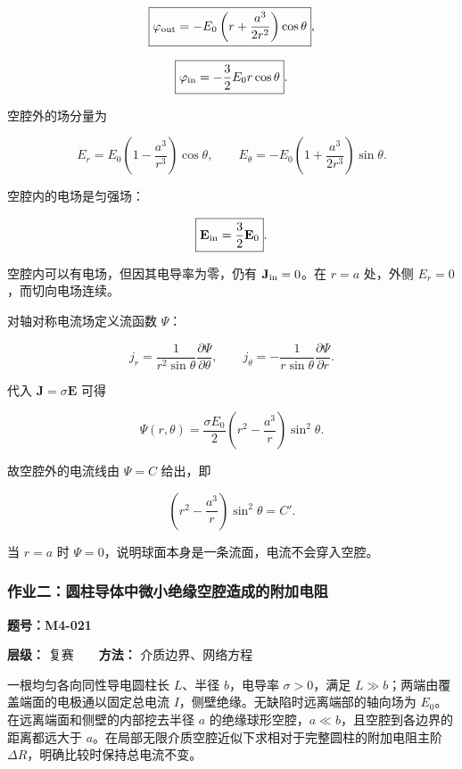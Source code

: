 \[
\boxed{
\varphi_{\rm out}
=-E_0\left(r+\frac{a^3}{2r^2}\right)\cos\theta
},
\]

\[
\boxed{
\varphi_{\rm in}=-\frac32E_0r\cos\theta
}.
\]

空腔外的场分量为

\[
\boxed{
E_r=E_0\left(1-\frac{a^3}{r^3}\right)\cos\theta,
\qquad
E_{\theta}=-E_0\left(1+\frac{a^3}{2r^3}\right)\sin\theta
}.
\]

空腔内的电场是匀强场：

\[
\boxed{\mathbf E_{\rm in}=\frac32\mathbf E_0}.
\]

空腔内可以有电场，但因其电导率为零，仍有 \(\mathbf J_{\rm in}=0\)。在
\(r=a\) 处，外侧 \(E_r=0\)，而切向电场连续。

对轴对称电流场定义流函数 \(\Psi\)：

\[
j_r=\frac{1}{r^2\sin\theta}\frac{\partial\Psi}{\partial\theta},
\qquad
j_{\theta}=-\frac{1}{r\sin\theta}\frac{\partial\Psi}{\partial r}.
\]

代入 \(\mathbf J=\sigma\mathbf E\) 可得

\[
\boxed{
\Psi(r,\theta)
=\frac{\sigma E_0}{2}
\left(r^2-\frac{a^3}{r}\right)\sin^2\theta
}.
\]

故空腔外的电流线由 \(\Psi=C\) 给出，即

\[
\boxed{
\left(r^2-\frac{a^3}{r}\right)\sin^2\theta=C'
}.
\]

当 \(r=a\) 时 \(\Psi=0\)，说明球面本身是一条流面，电流不会穿入空腔。

\par{}
\noindent\begin{minipage}{\linewidth}

\subsubsection{作业二：圆柱导体中微小绝缘空腔造成的附加电阻}\label{m4:ux4f5cux4e1aux4e8cux5706ux67f1ux5bfcux4f53ux4e2dux5faeux5c0fux7eddux7f18ux7a7aux8154ux9020ux6210ux7684ux9644ux52a0ux7535ux963b}

\textbf{题号：M4-021}

\textbf{层级：} 复赛　　\textbf{方法：} 介质边界、网络方程

一根均匀各向同性导电圆柱长 \(L\)、半径 \(b\)，电导率 \(\sigma>0\)，满足
\(L\gg b\)；两端由覆盖端面的电极通以固定总电流
\(I\)，侧壁绝缘。无缺陷时远离端部的轴向场为
\(E_0\)。在远离端面和侧壁的内部挖去半径 \(a\)
的绝缘球形空腔，\(a\ll b\)，且空腔到各边界的距离都远大于
\(a\)。在局部无限介质空腔近似下求相对于完整圆柱的附加电阻主阶
\(\Delta R\)，明确比较时保持总电流不变。

\end{minipage}\par

